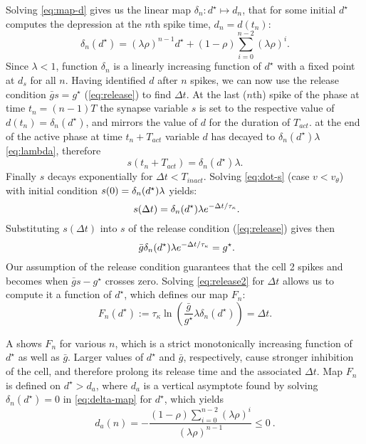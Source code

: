 Solving \cref{eq:map-d} gives us the linear map $\delta_n:d^{\star}\mapsto d_n$, that for some initial $d^\star$ computes the depression at the $n$th spike time, $d_n=d(t_n)$:
\begin{equation}
	\label{eq:delta-map}
	\delta_n(d^\star) = (\lambda \rho)^{n-1} d^\star + (1-\rho)\sum_{i=0}^{n-2}(\lambda \rho)^i.
\end{equation}
Since $\lambda < 1$, function $\delta_n$ is a linearly increasing function of $d^\star$ with a fixed point at $d_s$ for all $n$.
Having identified $d$ after $n$ spikes, we can now use the release condition $\bar g s = g^{\star}$ (\cref{eq:release}) to find $\Delta t$.
At the last ($n$th) spike of the \free{} phase at time $t_n = (n-1)T$ the synapse variable $s$ is set to the respective value of $d(t_n) = \delta_n(d^\star)$, and mirrors the value of $d$ for the duration of $T_{act}$.
at the end of the active phase at time $t_n + T_{act}$ variable $d$ has decayed to $\delta_n(d^\star) \lambda$ \cref{eq:lambda}, therefore
\begin{equation}
	s(t_n + T_{act})=\delta_n(d^\star)\lambda.
\end{equation}
Finally $s$ decays exponentially for $\Delta t < T_{inact}$.
Solving \cref{eq:dot-s} (case $v < v_\theta$) with initial condition $s(0)=\delta_n(d^\star)\lambda$ yields:
\begin{equation}
	~\label{eq:s-sol}
	s(\Delta t)=\delta_n(d^\star) \lambda e^{-\Delta t/\tau_\kappa}.
\end{equation}
Substituting $s(\Delta t)$ into $s$ of the release condition (\cref{eq:release}) gives then
\begin{equation}
	~\label{eq:release2}
	\bar g \delta_n(d^\star) \lambda e^{-\Delta t/\tau_\kappa}=g^{\star}.
\end{equation}
Our assumption of the release condition guarantees that the \suppressed{} cell 2 spikes and becomes \free{} when $\bar g s - g^{\star}$ crosses zero.
Solving \cref{eq:release2} for $\Delta t$ allows us to compute it a function of $d^\star$, which defines our map $F_n$:
\begin{equation}
	\label{eq:Fn-map}
	F_n(d^\star):=\tau_\kappa \ln{\left(\frac{\bar g }{g^\star} \lambda \delta_{n}(d^\star)\right)}= \Delta t.
\end{equation}

A shows $F_n$ for various $n$, which is a strict monotonically increasing function of $d^{\star}$ as well as $\bar g$.
Larger values of $d^{\star}$ and $\bar g$, respectively, cause stronger inhibition of the \suppressed{} cell, and therefore prolong its release time and the associated $\Delta t$.
Map $F_n$ is defined on $d^{\star}>d_{a}$, where $d_{a}$ is a vertical asymptote found by solving $\delta_{n}(d^\star)=0$ in \cref{eq:delta-map} for $d^\star$, which yields
\begin{equation}
	d_{a}(n)=-\frac{(1-\rho)\sum_{i=0}^{n-2}(\lambda \rho)^{i}}{ (\lambda \rho)^{n-1} }\leq 0~\label{eq:da}.
\end{equation}

